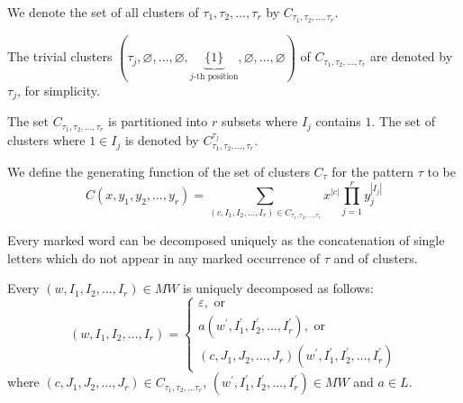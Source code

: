 \documentclass[12pt]{report}
\begin{document}
{{We denote the set of all clusters of $\tau_1, \tau_2, \ldots, \tau_r$ by $C_{\tau_1, \tau_2, \ldots, \tau_r}$. 

The trivial clusters $(\tau_j,\varnothing, \ldots, \varnothing, \underbrace{\{1\}}_{\textrm{$j$-th position}}, \varnothing, \ldots, \varnothing)$ of $C_{\tau_1, \tau_2, \ldots, \tau_r}$ are denoted by $\tau_j$, for simplicity.

The set $C_{\tau_1, \tau_2, \ldots, \tau_r}$ is partitioned into $r$ subsets where $I_j$ contains $1$. The set of clusters where $1 \in I_j$ is denoted by $C_{\tau_1, \tau_2, \ldots, \tau_r}^{\tau_j}$.

We define the generating function of the set of clusters $C_\tau$ for the pattern $\tau$ to be
\[ C(x,y_1, y_2, \ldots, y_r) = \sum\limits_{(c,I_1, I_2, \ldots, I_r) \in C_{\tau_1, \tau_2, \ldots, \tau_r}} x^{|c|} \prod\limits_{j=1}^r y_j^{|I_j|} \]


Every marked word can be decomposed uniquely as the concatenation of single letters which do not appear in any marked occurrence of $\tau$ and of clusters.

Every $(w, I_1, I_2, \ldots, I_r) \in MW$ is uniquely decomposed as follows:
\[ (w, I_1, I_2, \ldots, I_r) = \begin{cases} \varepsilon, \textrm{ or }\\
a (w^\prime, I_1^\prime, I_2^\prime, \ldots, I_r^\prime), \textrm{ or } \\
(c, J_1, J_2, \ldots, J_r) (w^\prime, I_1^\prime, I_2^\prime, \ldots, I_r^\prime) 
\end{cases}\]
where $(c, J_1, J_2, \ldots, J_r) \in C_{\tau_1, \tau_2, \ldots \tau_r}$, $(w^\prime, I_1^\prime, I_2^\prime, \ldots, I_r^\prime) \in MW$ and $a \in L$.

}}
\end{document}
